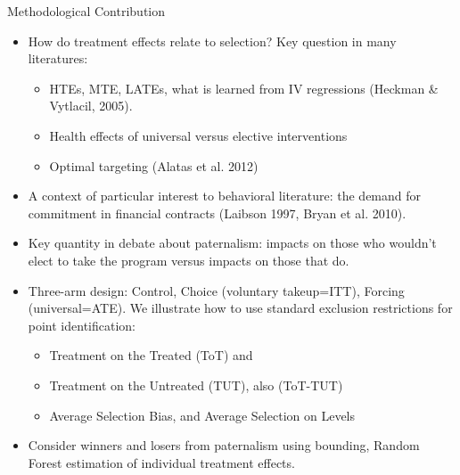 \documentclass[8pt]{beamer}
\begin{document}
\begin{frame}{Methodological Contribution}
\begin{itemize}
    \vfill \item How do treatment effects relate to selection?  Key question in many literatures:
	\begin{itemize} 
		\item HTEs, MTE, LATEs, what is learned from IV regressions (Heckman \& Vytlacil, 2005).
		\item Health effects of universal versus elective interventions
		\item Optimal targeting (Alatas et al. 2012)
	\end{itemize}
     \vfill \item A context of particular interest to behavioral literature:  the demand for commitment in financial contracts (Laibson 1997, Bryan et al. 2010).
     \vfill \item Key quantity in debate about paternalism:  impacts on those who wouldn't elect to take the program versus impacts on those that do.
     \vfill \item Three-arm design:  Control, Choice (voluntary takeup=ITT), Forcing (universal=ATE).  We illustrate how to use standard exclusion restrictions for point identification:
    \begin{itemize}
        \item Treatment on the Treated (ToT) and 
        \item Treatment on the Untreated (TUT), also (ToT-TUT)
	\item Average Selection Bias, and Average Selection on Levels
    \end{itemize} 
   \vfill   \item Consider winners and losers from paternalism using bounding, Random Forest estimation of individual treatment effects. 
\end{itemize}
\end{frame}
\end{document}

